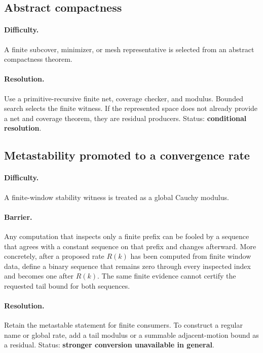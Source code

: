 \subsection{Abstract compactness}

\paragraph{Difficulty.}
A finite subcover, minimizer, or mesh representative is selected from an abstract compactness theorem.

\paragraph{Resolution.}
Use a primitive-recursive finite net, coverage checker, and modulus.  Bounded search selects the finite witness.  If the represented space does not already provide a net and coverage theorem, they are residual producers.  Status: \textbf{conditional resolution}.

\subsection{Metastability promoted to a convergence rate}

\paragraph{Difficulty.}
A finite-window stability witness is treated as a global Cauchy modulus.

\paragraph{Barrier.}
Any computation that inspects only a finite prefix can be fooled by a sequence that agrees with a constant sequence on that prefix and changes afterward.  More concretely, after a proposed rate \(R(k)\) has been computed from finite window data, define a binary sequence that remains zero through every inspected index and becomes one after \(R(k)\).  The same finite evidence cannot certify the requested tail bound for both sequences.

\paragraph{Resolution.}
Retain the metastable statement for finite consumers.  To construct a regular name or global rate, add a tail modulus or a summable adjacent-motion bound as a residual.  Status: \textbf{stronger conversion unavailable in general}.

